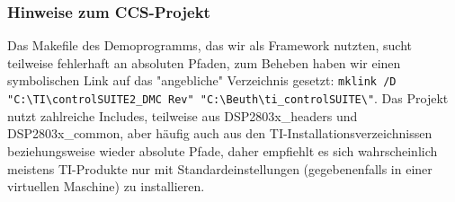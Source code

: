  \subsubsection{Hinweise zum CCS-Projekt}
  Das Makefile des Demoprogramms, das wir als Framework nutzten, sucht teilweise fehlerhaft  an absoluten Pfaden, zum Beheben haben wir einen symbolischen Link auf das "angebliche" Verzeichnis gesetzt: {\lstinline[breaklines=true]$mklink /D "C:\TI\controlSUITE2_DMC Rev" "C:\Beuth\ti_controlSUITE\"$}. Das Projekt nutzt zahlreiche Includes, teilweise aus DSP2803x\_headers und DSP2803x\_common, aber häufig auch aus den TI-Installationsverzeichnissen beziehungsweise wieder absolute Pfade, daher empfiehlt es sich wahrscheinlich meistens TI-Produkte nur mit Standardeinstellungen (gegebenenfalls in einer virtuellen Maschine) zu installieren. 
 
